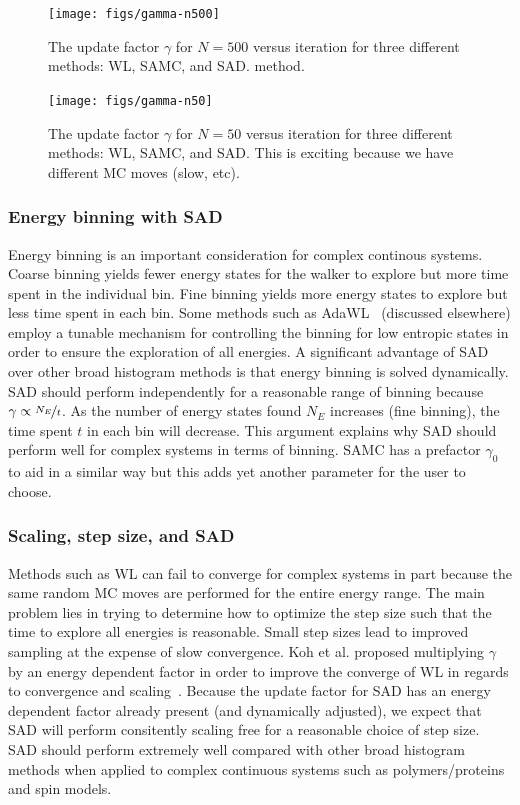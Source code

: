 \documentclass[letterpaper,twocolumn,amsmath,amssymb,pre,aps,10pt]{revtex4-1}
\begin{document}
\begin{figure}
  \texttt{[image: figs/gamma-n500]}
  \caption{The update factor $\gamma$ for $N=500$ versus iteration for three
    different methods: WL, SAMC, and SAD.
    method.}\label{fig:gamma-vs-t}
\end{figure}
\begin{figure}
  \texttt{[image: figs/gamma-n50]}
  \caption{The update factor $\gamma$ for $N=50$ versus iteration for three
    different methods: WL, SAMC, and SAD.  This is exciting because we
    have different MC moves (slow, etc).}
\end{figure}

\subsubsection{Energy binning with SAD}

Energy binning is an important consideration for complex continous
systems. Coarse binning yields fewer energy states for the walker to
explore but more time spent in the individual bin. Fine binning yields
more energy states to explore but less time spent in each bin.  Some
methods such as AdaWL~\cite{koh2013dynamically} (discussed elsewhere)
employ a tunable mechanism for controlling the binning for low entropic
states in order to ensure the exploration of all energies. A
significant advantage of SAD over other broad histogram methods is that
energy binning is solved dynamically. SAD should perform independently
for a reasonable range of binning because $\gamma \propto
\nicefrac{N_{E}}{t}$.  As the number of energy states found $N_{E}$
increases (fine binning), the time spent $t$ in each bin will decrease.
This argument explains why SAD should perform well for complex systems
in terms of binning. SAMC has a prefactor $\gamma_0$ to aid in a
similar way but this adds yet another parameter for the user to choose.

\subsubsection{Scaling, step size, and SAD}
Methods such as WL can fail to converge for complex systems in part
because the same random MC moves are performed for the entire energy
range.  The main problem lies in trying to determine how to optimize
the step size such that the time to explore all energies is reasonable.
Small step sizes lead to improved sampling at the expense of slow
convergence. Koh et al. proposed multiplying $\gamma$ by an energy
dependent factor in order to improve the converge of WL in regards to
convergence and scaling~\cite{koh2013dynamically}.  Because the update
factor for SAD has an energy dependent factor already present (and
dynamically adjusted), we expect that SAD will perform consitently
scaling free for a reasonable choice of step size.  SAD should perform
extremely well compared with other broad histogram methods when applied
to complex continuous systems such as polymers/proteins and spin models.
\end{document}
